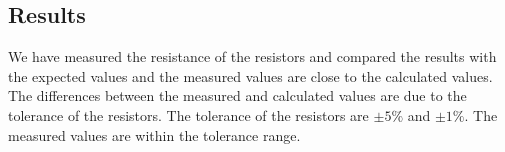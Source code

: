 \subsection{Results}
We have measured the resistance of the resistors and compared the results with the expected values and the measured values are close to the calculated values. The differences between the measured and calculated values are due to the tolerance of the resistors. The tolerance of the resistors are \(\pm5\%\) and \(\pm1\%\). The measured values are within the tolerance range.

\newpage
\thispagestyle{plain}

